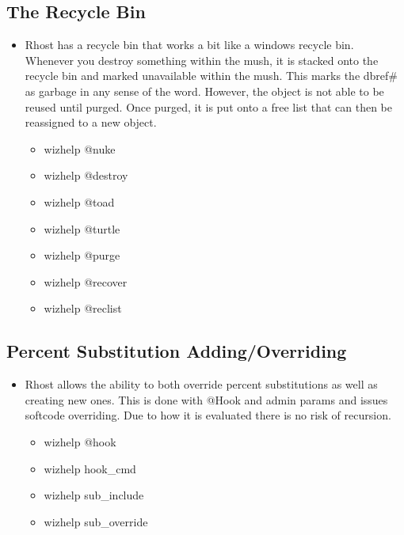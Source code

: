 \documentclass[letterpaper,10pt,english]{sphinxmanual}
\begin{document}
\subsection{The Recycle Bin}
\label{\detokenize{features:the-recycle-bin}}\begin{itemize}
\item {} 
\sphinxAtStartPar
Rhost has a recycle bin that works a bit like a windows recycle bin.
Whenever you destroy something within the mush, it is stacked onto
the recycle bin and marked unavailable within the mush.  This marks
the dbref\# as garbage in any sense of the word.  However, the object
is not able to be reused until purged.  Once purged, it is put onto
a free list that can then be reassigned to a new object.
\begin{itemize}
\item {} 
\sphinxAtStartPar
wizhelp @nuke

\item {} 
\sphinxAtStartPar
wizhelp @destroy

\item {} 
\sphinxAtStartPar
wizhelp @toad

\item {} 
\sphinxAtStartPar
wizhelp @turtle

\item {} 
\sphinxAtStartPar
wizhelp @purge

\item {} 
\sphinxAtStartPar
wizhelp @recover

\item {} 
\sphinxAtStartPar
wizhelp @reclist

\end{itemize}

\end{itemize}


\subsection{Percent Substitution Adding/Overriding}
\label{\detokenize{features:percent-substitution-adding-overriding}}\begin{itemize}
\item {} 
\sphinxAtStartPar
Rhost allows the ability to both override percent substitutions as
well as creating new ones.  This is done with @Hook and admin
params and issues softcode overriding.  Due to how it is evaluated
there is no risk of recursion.
\begin{itemize}
\item {} 
\sphinxAtStartPar
wizhelp @hook

\item {} 
\sphinxAtStartPar
wizhelp hook\_cmd

\item {} 
\sphinxAtStartPar
wizhelp sub\_include

\item {} 
\sphinxAtStartPar
wizhelp sub\_override

\end{itemize}

\end{itemize}
\end{document}
